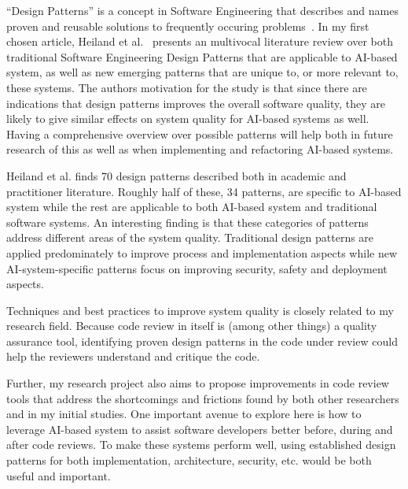 \documentclass[a4paper,twocolumn]{article}
\begin{document}
``Design Patterns'' is a concept in Software Engineering that describes and
names proven and reusable solutions to frequently occuring
problems~\cite{Gamma2001}. In my first chosen article, Heiland et
al.~\cite{heiland_design_2023} presents an multivocal literature review over both traditional
Software Engineering Design Patterns that are applicable to AI-based system, as
well as new emerging patterns that are unique to, or more relevant to, these
systems. The authors motivation for the study is that since there are
indications that design patterns improves the overall software quality, they are
likely to give similar effects on system quality for AI-based systems as well.
Having a comprehensive overview over possible patterns will help both in future
research of this as well as when implementing and refactoring AI-based systems.

Heiland et al. finds 70 design patterns described both in academic and
practitioner literature. Roughly half of these, 34 patterns, are specific to
AI-based system while the rest are applicable to both AI-based system and
traditional software systems. An interesting finding is that these categories of
patterns address different areas of the system quality. Traditional design
patterns are applied predominately to improve process and implementation aspects
while new AI-system-specific patterns focus on improving security, safety and
deployment aspects.

Techniques and best practices to improve system quality is closely related to my
research field. Because code review in itself is (among other things) a quality
assurance tool, identifying proven design patterns in the code under review
could help the reviewers understand and critique the code. 

Further, my research project also aims to propose improvements in code review
tools that address the shortcomings and frictions found by both other
researchers and in my initial studies. One important avenue to explore here is
how to leverage AI-based system to assist software developers better before,
during and after code reviews. To make these systems perform well, using
established design patterns for both implementation, architecture, security,
etc. would be both useful and important.




\end{document}
